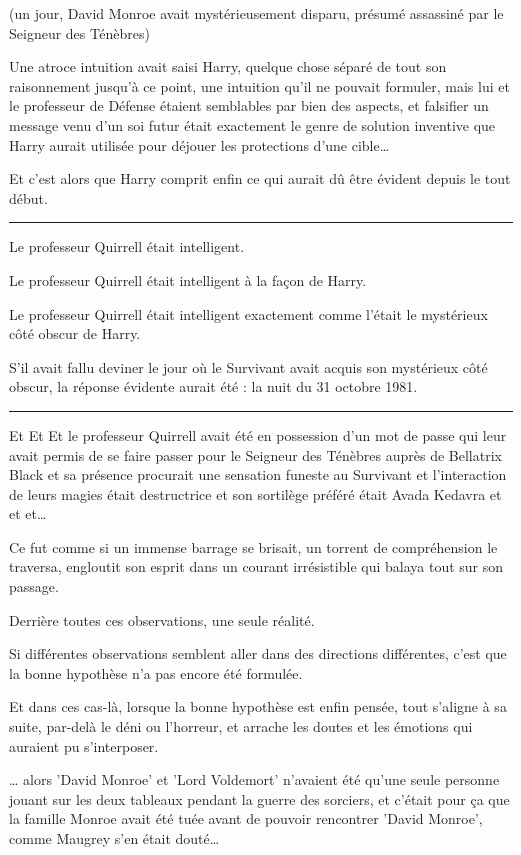 (un jour, David Monroe avait mystérieusement disparu, présumé assassiné par le Seigneur des Ténèbres)

Une atroce intuition avait saisi Harry, quelque chose séparé de tout son raisonnement jusqu'à ce point, une intuition qu'il ne pouvait formuler, mais lui et le professeur de Défense étaient semblables par bien des aspects, et falsifier un message venu d'un soi futur était exactement le genre de solution inventive que Harry aurait utilisée pour déjouer les protections d'une cible…

Et c'est alors que Harry comprit enfin ce qui aurait dû être évident depuis le tout début.
\par\noindent\rule{\textwidth}{0.4pt}
Le professeur Quirrell était intelligent.

Le professeur Quirrell était intelligent à la façon de Harry.

Le professeur Quirrell était intelligent exactement comme l'était le mystérieux côté obscur de Harry.

S'il avait fallu deviner le jour où le Survivant avait acquis son mystérieux côté obscur, la réponse évidente aurait été : la nuit du 31 octobre 1981.
\par\noindent\rule{\textwidth}{0.4pt}
Et Et Et le professeur Quirrell avait été en possession d'un mot de passe qui leur avait permis de se faire passer pour le Seigneur des Ténèbres auprès de Bellatrix Black et sa présence procurait une sensation funeste au Survivant et l'interaction de leurs magies était destructrice et son sortilège préféré était Avada Kedavra et et et…

Ce fut comme si un immense barrage se brisait, un torrent de compréhension le traversa, engloutit son esprit dans un courant irrésistible qui balaya tout sur son passage.

Derrière toutes ces observations, une seule réalité.

Si différentes observations semblent aller dans des directions différentes, c'est que la bonne hypothèse n'a pas encore été formulée.

Et dans ces cas-là, lorsque la bonne hypothèse est enfin pensée, tout s'aligne à sa suite, par-delà le déni ou l'horreur, et arrache les doutes et les émotions qui auraient pu s'interposer.

… alors 'David Monroe' et 'Lord Voldemort' n'avaient été qu'une seule personne jouant sur les deux tableaux pendant la guerre des sorciers, et c'était pour ça que la famille Monroe avait été tuée avant de pouvoir rencontrer 'David Monroe', comme Maugrey s'en était douté…

